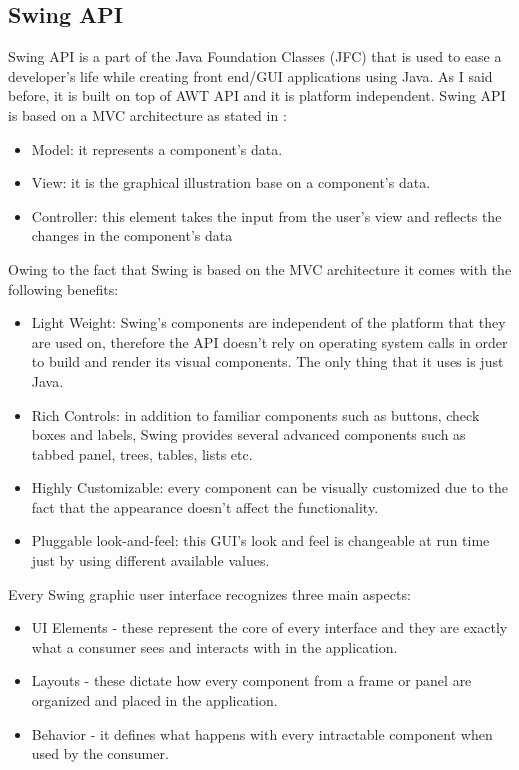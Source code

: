 \documentclass[12pt,a4paper]{report}
\begin{document}
\subsection{Swing API}
Swing API is a part of the Java Foundation Classes (JFC) that is used to ease a developer's life while creating front end/GUI applications using Java. As I said before, it is built on top of AWT API and it is platform independent. Swing API is based on a MVC architecture as stated in \cite{swing}:
 \begin{itemize}
 	\item Model: it represents a component's data.  
 	\item View: it is the graphical illustration base on a component's data.
 	\item Controller: this element takes the input from the user's view and reflects the changes in the component's data
 \end{itemize}
Owing to the fact that Swing is based on the MVC architecture it comes with the following benefits:
\begin{itemize}
	\item Light Weight: Swing's components are independent of the platform that they are used on, therefore the API doesn't rely on operating system calls in order to build and render its visual components. The only thing that it uses is just Java. 
	\item Rich Controls: in addition to familiar components such as buttons, check boxes and labels, Swing provides several advanced components such as tabbed panel, trees, tables, lists etc.
	\item Highly Customizable: every component can be visually customized due to the fact that the appearance doesn't affect the functionality.
	\item Pluggable look-and-feel: this GUI's look and feel is changeable at run time just by using different available values.    
\end{itemize}
Every Swing graphic user interface recognizes three main aspects:
\begin{itemize}
	\item UI Elements - these represent the core of every interface and they are exactly what a consumer sees and interacts with in the application. 
	\item Layouts - these dictate how every component from a frame or panel are organized and placed in the application.
	\item Behavior - it defines what happens with every intractable component when used by the consumer.
\end{itemize}
\end{document}
